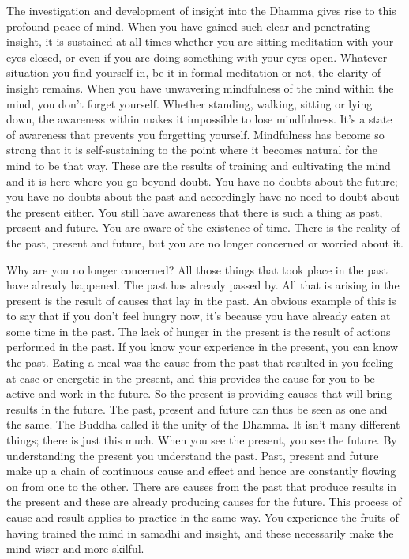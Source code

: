 The investigation and development of insight into the Dhamma gives rise to this profound peace of mind. When you have gained such clear and penetrating insight, it is sustained at all times whether you are sitting meditation with your eyes closed, or even if you are doing something with your eyes open. Whatever situation you find yourself in, be it in formal meditation or not, the clarity of insight remains. When you have unwavering mindfulness of the mind within the mind, you don't forget yourself. Whether standing, walking, sitting or lying down, the awareness within makes it impossible to lose mindfulness. It's a state of awareness that prevents you forgetting yourself. Mindfulness has become so strong that it is self-sustaining to the point where it becomes natural for the mind to be that way. These are the results of training and cultivating the mind and it is here where you go beyond doubt. You have no doubts about the future; you have no doubts about the past and accordingly have no need to doubt about the present either. You still have awareness that there is such a thing as past, present and future. You are aware of the existence of time. There is the reality of the past, present and future, but you are no longer concerned or worried about it.

Why are you no longer concerned? All those things that took place in the past have already happened. The past has already passed by. All that is arising in the present is the result of causes that lay in the past. An obvious example of this is to say that if you don't feel hungry now, it's because you have already eaten at some time in the past. The lack of hunger in the present is the result of actions performed in the past. If you know your experience in the present, you can know the past. Eating a meal was the cause from the past that resulted in you feeling at ease or energetic in the present, and this provides the cause for you to be active and work in the future. So the present is providing causes that will bring results in the future. The past, present and future can thus be seen as one and the same. The Buddha called it  the unity of the Dhamma. It isn't many different things; there is just this much. When you see the present, you see the future. By understanding the present you understand the past. Past, present and future make up a chain of continuous cause and effect and hence are constantly flowing on from one to the other. There are causes from the past that produce results in the present and these are already producing causes for the future. This process of cause and result applies to practice in the same way. You experience the fruits of having trained the mind in sam\=adhi and insight, and these necessarily make the mind wiser and more skilful.

